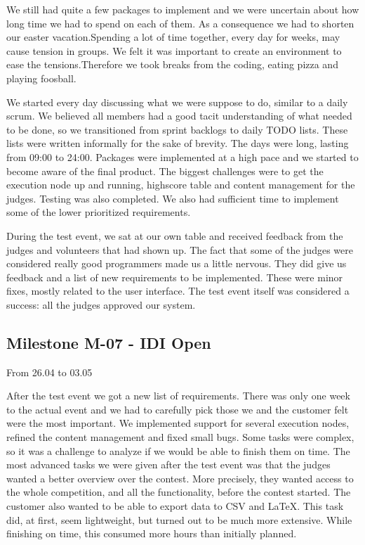 We still had quite a few packages to implement and we were uncertain
about how long time we had to spend on each of them. As a consequence
we had to shorten our easter vacation.Spending a lot of time together,
every day for weeks, may cause tension in groups. We felt it was
important to create an environment to ease the tensions.Therefore we
took breaks from the coding, eating pizza and playing foosball. 




We started every day discussing what we were suppose to do, similar to a
daily scrum. We believed all members had a good tacit understanding of
what needed to be done, so we transitioned from sprint backlogs to
daily TODO lists. These lists were written informally for the sake of
brevity.\newline
\newline
The days were long, lasting from 09:00 to 24:00. Packages were
implemented at a high pace and we started to become aware of the final
product. The biggest challenges were to get the execution node up and
running, highscore table and content management for the judges. Testing
was also completed. We also had sufficient time to implement some of
the lower prioritized requirements. 




During the test event, we sat at our own table and received feedback
from the judges and volunteers that had shown up. The fact that some of
the judges were considered really good programmers made us a little
nervous. They did give us feedback and a list of new requirements to be
implemented. These were minor fixes, mostly related to the user
interface. The test event itself was considered a success: all the
judges approved our system.




\subsection{Milestone M-07 - IDI Open}
\label{sec:M07}
From 26.04 to 03.05

After the test event we got a new list of requirements. There was only
one week to the actual event and we had to carefully pick those we and
the customer felt were the most important. We implemented support for
several execution nodes, refined the content management and fixed small
bugs. Some tasks were complex, so it was a challenge to analyze if we
would be able to finish them on time. The most advanced tasks we were
given after the test event was that the judges wanted a better overview
over the contest. More precisely, they wanted access to the whole
competition, and all the functionality, before the contest started. The
customer also wanted to be able to export data to CSV and LaTeX. This
task did, at first, seem lightweight, but turned out to be much more
extensive. While finishing on time, this consumed more hours than
initially planned.




